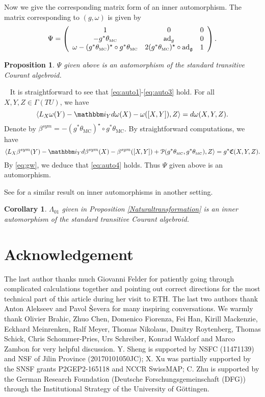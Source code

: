 \documentclass[letterpaper,10pt, oneside]{article} %
\newtheorem{cor}[thm]{Corollary}
\newtheorem{pro}[thm]{Proposition}
\newcommand{\pf}{\noindent{\bf Proof.}\ }
\newcommand{\ii}{\mathbbm i}
\newcommand{\TM}{\theta_{\scriptscriptstyle \mathrm{MC}}}
\newcommand{\huaP}{\mathcal{P}}
\newcommand{\frkC}{\mathfrak C}
\def\qed{\hfill ~\vrule height6pt width6pt depth0pt}
\newcommand{\ad}{\mathrm{ad}}
\begin{document}
Now we give the corresponding matrix form of an inner automorphism.
The matrix corresponding to $(g,\omega)$ is given by
\begin{equation}\label{eq:severainner}
\Psi=\left(\begin{array}{ccc}
1&0&0\\
-g^*\TM&\ad_{g}&0\\
\omega-(g^*\TM)^\star \circ g^*\TM &2(g^*\TM)^\star\circ \ad_\g&1
\end{array}\right).
\end{equation}


\begin{pro}
$\Psi$ given above is an automorphism of the standard transitive Courant algebroid.
\end{pro}
\pf
It is straightforward to see that \eqref{eq:auto1}-\eqref{eq:auto3} hold. For all $X,Y,Z\in\Gamma(TU)$, we have
$$\langle L_X\omega(Y)-\ii_Y d\omega(X)-\omega([X,Y]),Z\rangle=d\omega(X,Y,Z).$$
Denote by $\beta^{sym}=-(g^*\TM)^\star \circ g^*\TM $. By straightforward computations, we have
 $$
 \langle L_X\beta^{sym}(Y)-\ii_Y d\beta^{sym}(X)-\beta^{sym}([X,Y])+\huaP(g^*\TM,g^*\TM),Z\rangle =g^*\frkC(X,Y,Z).
 $$
By \eqref{eq:gw}, we deduce that \eqref{eq:auto4} holds. Thus $\Psi$ given above is an automorphism. \qed\vspace{3mm}

See \cite[Corollary 4.2]{GRT} for a similar result on inner automorphisms in another setting.

\begin{cor}
  $\Lambda_{01}$ given in Proposition \ref{Naturaltransformation} is an inner automorphism of the standard transitive Courant algebroid.
\end{cor}


\section*{Acknowledgement} The last author thanks much
Giovanni Felder for patiently going through complicated calculations together and pointing out correct directions for the most technical part of this article during her visit to ETH. The last two authors thank Anton Alekseev and Pavol ${\rm\check{S}}$evera for many inspiring conversations.
We warmly thank Olivier Brahic, Zhuo Chen, Domenico Fiorenza, Fei Han,
Kirill Mackenzie, Eckhard Meinrenken, Ralf Meyer, Thomas Nikolaus, Dmitry Roytenberg, Thomas Schick, Chris Schommer-Pries, Urs Schreiber, Konrad Waldorf and Marco Zambon for very helpful discussion. Y. Sheng is supported by NSFC (11471139) and NSF of Jilin Province (20170101050JC);
X. Xu was partially supported by the SNSF grants P2GEP2-165118 and NCCR SwissMAP; C. Zhu is supported by the German Research Foundation
(Deutsche Forschungsgemeinschaft (DFG)) through the Institutional
Strategy of the University of G\"ottingen.
\end{document}
